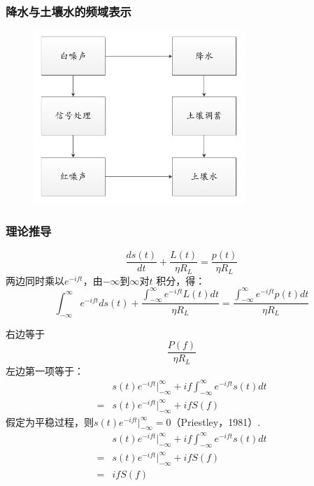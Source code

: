 \documentclass{beamer}
\begin{document}
\begin{CJK}{UTF8}{gkai}
\begin{frame}
\end{frame}

\begin{frame}
\frametitle{降水与土壤水的频域表示}
\begin{figure}[H]
\centering
\includegraphics[width=8cm]{noise.png}
\end{figure} 
\end{frame} 



\begin{frame}
\frametitle{理论推导}
\begin{equation*}
\frac{ds(t)}{dt}+\frac{L(t)}{\eta R_L}=\frac{p(t)}{\eta R_L}
\end{equation*} 
两边同时乘以$e^{-ift}$，由$-\infty$到$\infty$对$t$ 积分，得：
\begin{equation*}
\int_{-\infty}^{\infty}e^{-ift}ds(t)+\frac{\int_{-\infty}^{\infty}e^{-ift}L(t)dt}{\eta R_L}=\frac{\int_{-\infty}^{\infty}e^{-ift}p(t)dt}{\eta R_L}
\end{equation*} 
\end{frame}

\begin{frame}
右边等于
\begin{equation*}
\frac{P(f)}{\eta R_L} 
\end{equation*}
左边第一项等于：
\begin{equation*}
\begin{split}
&s(t)e^{-ift}|_{-\infty}^{\infty}+if\int_{-\infty}^{\infty}e^{-ift}s(t)dt\\=&s(t)e^{-ift}|_{-\infty}^{\infty}+ifS(f)
\end{split}
\end{equation*}
假定为平稳过程，则$s(t)e^{-ift}|_{-\infty}^{\infty}=0$（Priestley，1981）.
\begin{equation*}
\begin{split}
&s(t)e^{-ift}|_{-\infty}^{\infty}+if\int_{-\infty}^{\infty}e^{-ift}s(t)dt\\=&s(t)e^{-ift}|_{-\infty}^{\infty}+ifS(f)\\=&ifS(f)
\end{split}
\end{equation*}
\end{frame}


\end{CJK}
\end{document}
